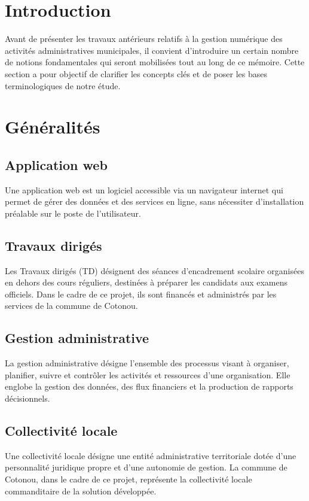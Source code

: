 \section*{Introduction}
Avant de présenter les travaux antérieurs relatifs à la gestion numérique 
des activités administratives municipales, il convient d'introduire un 
certain nombre de notions fondamentales qui seront mobilisées tout au long 
de ce mémoire. Cette section a pour objectif de clarifier les concepts clés 
et de poser les bases terminologiques de notre étude.

\section{Généralités}

\subsection{Application web}
Une application web est un logiciel accessible via un navigateur internet 
qui permet de gérer des données et des services en ligne, sans nécessiter 
d'installation préalable sur le poste de l'utilisateur.

\subsection{Travaux dirigés}
Les Travaux dirigés (TD) désignent des séances d'encadrement scolaire 
organisées en dehors des cours réguliers, destinées à préparer les 
candidats aux examens officiels. Dans le cadre de ce projet, ils sont 
financés et administrés par les services de la commune de Cotonou.

\subsection{Gestion administrative}
La gestion administrative désigne l'ensemble des processus visant à 
organiser, planifier, suivre et contrôler les activités et ressources 
d'une organisation. Elle englobe la gestion des données, des flux 
financiers et la production de rapports décisionnels.

\subsection{Collectivité locale}
Une collectivité locale désigne une entité administrative territoriale 
dotée d'une personnalité juridique propre et d'une autonomie de gestion. 
La commune de Cotonou, dans le cadre de ce projet, représente la 
collectivité locale commanditaire de la solution développée.

